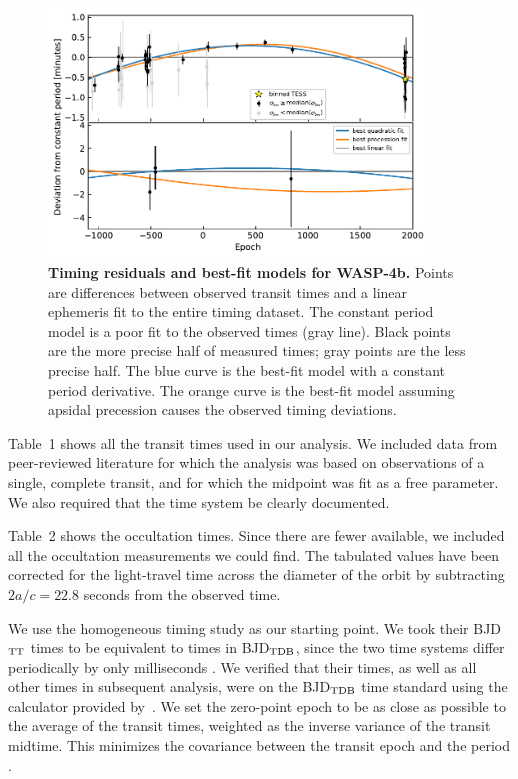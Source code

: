 \documentclass[12pt,twocolumn,tighten]{aastex62}
\begin{document}
\begin{figure}[t]
    \begin{center}
        \leavevmode
        \includegraphics[width=0.9\textwidth]{f3.pdf}
    \end{center}
    \vspace{-0.5cm}
    \caption{
        {\bf Timing residuals and best-fit models for WASP-4b.}
        Points are differences between observed transit times and a
        linear ephemeris fit to the entire timing dataset.  The
        constant period model is a poor fit to the observed times
        (gray line).  Black points are the more precise half of
        measured times; gray points are the less precise half.  The
        blue curve is the best-fit model with a constant period
        derivative.  The orange curve is the best-fit model assuming
        apsidal precession causes the observed timing deviations.
        \label{fig:times}
    }
\end{figure}

Table~1 shows all the transit times used in our analysis.  We included
data from peer-reviewed literature for which the analysis was based on
observations of a single, complete transit, and for which the midpoint
was fit as a free parameter. We also required that the time system be
clearly documented.

Table~2 shows the occultation times.  Since there are fewer available,
we included all the occultation measurements we could find. The
tabulated values have been corrected for the light-travel time across
the diameter of the orbit by subtracting $2a/c = 22.8$ seconds from
the observed time.

We use the homogeneous \citet{hoyer_tramos_2013} timing study as our
starting point.  We took their BJD$_{\rm TT}$ times to be equivalent
to times in BJD$_{\rm TDB}$, since the two time systems differ
periodically by only milliseconds \citep{urban_explanatory_2012}.  We
verified that their times, as well as all other times in subsequent
analysis, were on the BJD$_{\rm TDB}$ time standard using the
calculator provided by~\citet{eastman_achieving_2010}.  We set the
zero-point epoch to be as close as possible to the average of the
transit times, weighted as the inverse variance of the transit
midtime. This minimizes the covariance between the transit epoch and
the period \citep{gibson_gemini_2013}.
\end{document}
